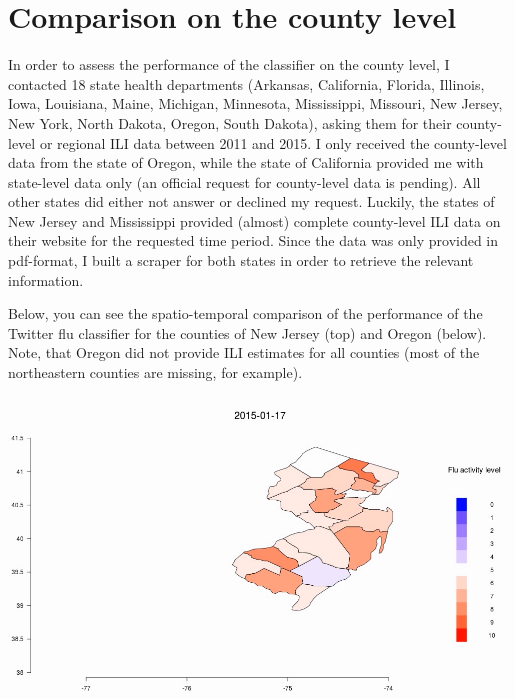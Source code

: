 \documentclass[11pt, a4paper]{report}\usepackage[]{graphicx}\usepackage[]{color}
\begin{document}
\raggedright

\section{Comparison on the county level}
In order to assess the performance of the classifier on the county level, I contacted 18 state health departments (Arkansas, California, Florida, Illinois, Iowa, Louisiana, Maine, Michigan, Minnesota, Mississippi, Missouri, New Jersey, New York, North Dakota, Oregon, South Dakota), asking them for their county-level or regional ILI data between 2011 and 2015. I only received the county-level data from the state of Oregon, while the state of California provided me with state-level data only (an official request for county-level data is pending). All other states did either not answer or declined my request. Luckily, the states of New Jersey and Mississippi provided (almost) complete county-level ILI data on their website for the requested time period. Since the data was only provided in pdf-format, I built a scraper for both states in order to retrieve the relevant information.\newline 

Below, you can see the spatio-temporal comparison of the performance of the Twitter flu classifier for the counties of New Jersey (top) and Oregon (below). Note, that Oregon did not provide ILI estimates for all counties (most of the northeastern counties are missing, for example).\newline

\centering \href{run:vids/county_Twitter_cdc_diff_newjersey.avi}{\includegraphics[scale=0.5]{vids/Screenshot_Jersey.png}} 

\bigskip
\end{document}

